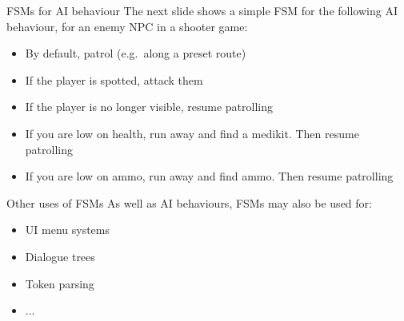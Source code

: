 \begin{frame}{FSMs for AI behaviour}
    The next slide shows a simple FSM for the following AI behaviour, for an enemy NPC in a shooter game: \pause
    \begin{itemize}
        \item By default, patrol (e.g.\ along a preset route) \pause
        \item If the player is spotted, attack them \pause
        \item If the player is no longer visible, resume patrolling \pause
        \item If you are low on health, run away and find a medikit. Then resume patrolling \pause
        \item If you are low on ammo, run away and find ammo. Then resume patrolling \pause
    \end{itemize}
\end{frame}

\begin{frame}
    \begin{center}\end{center}
\end{frame}

\begin{frame}{Other uses of FSMs}
    As well as AI behaviours, FSMs may also be used for: \pause
    \begin{itemize}
        \item UI menu systems \pause
        \item Dialogue trees \pause
        \item Token parsing \pause
        \item ...
    \end{itemize}
\end{frame}

